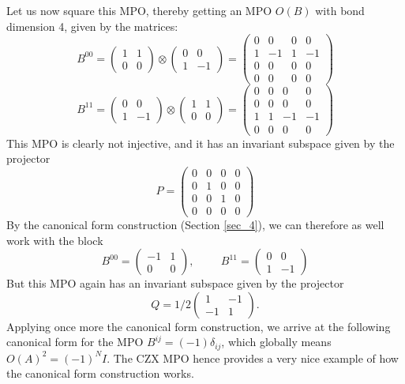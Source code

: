 \documentclass[rmp,aps,reprint,superscriptaddress,nobalancelastpage]{revtex4-1}
\begin{document}
Let us now square this MPO, thereby getting an MPO $O(B)$ with bond dimension 4, given by the matrices:
\[B^{00}=\begin{pmatrix}1 & 1 \\0 & 0\end{pmatrix}\otimes \begin{pmatrix}0 & 0\\1 & -1 \end{pmatrix}=\begin{pmatrix} 0 & 0 & 0 & 0\\1 & -1 & 1 & -1\\0 & 0 & 0 & 0\\0 & 0 & 0 & 0\end{pmatrix} \]
\[B^{11}=\begin{pmatrix}0 & 0\\1 & -1 \end{pmatrix}\otimes\begin{pmatrix}1 & 1\\0 & 0\end{pmatrix}=\begin{pmatrix}0 & 0 & 0 & 0\\0 & 0 & 0 & 0\\1 & 1 & -1 & -1\\0 & 0 & 0 & 0 \end{pmatrix}\]
This MPO is clearly not injective, and it has an invariant subspace given by the projector
\[P=\begin{pmatrix}0 & 0 & 0 & 0\\0 & 1 & 0 & 0\\0 & 0 & 1 & 0\\0 & 0 & 0 & 0\end{pmatrix}\]
By the canonical form construction (Section \ref{sec_4}), we can therefore as well work with the block
\[B^{00}=\begin{pmatrix}-1 & 1\\0 & 0\end{pmatrix},\hspace{1cm} B^{11}=\begin{pmatrix}0 & 0\\1 & -1\end{pmatrix}\]
But this MPO again has an invariant subspace given by the projector $$Q=1/2\begin{pmatrix}1 & -1\\-1 & 1\end{pmatrix}.$$ Applying once more the canonical form construction, we arrive at the following canonical form for the MPO
$B^{ij}= (-1)\delta_{ij}$, which globally means ${O}(A)^2=(-1)^N I$. The CZX MPO hence provides a very nice example of how the canonical form construction works.
\end{document}
